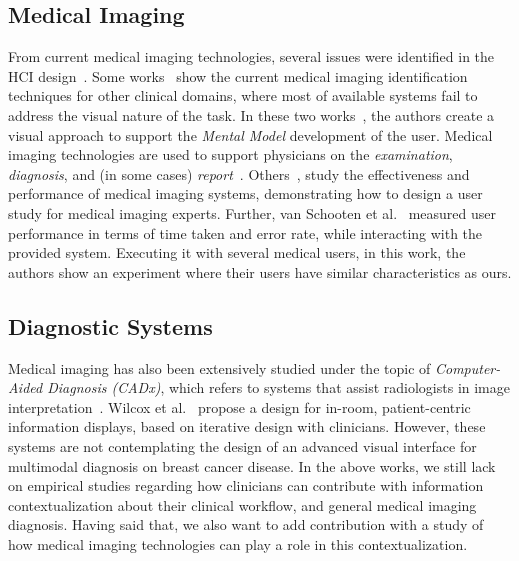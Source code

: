 \subsection{Medical Imaging}

From current medical imaging technologies, several issues were identified in the HCI design~\cite{Calisto:2017:TTM:3132272.3134111, calisto2017mimbcdui, Igarashi:2016:IVS:2984511.2984537}.
Some works~\cite{Balducci:2018:BQA:3206505.3206555, Rosado:2015:NFS:2826165.2826213} show the current medical imaging identification techniques for other clinical domains, where most of available systems fail to address the visual nature of the task.
In these two works~\cite{Balducci:2018:BQA:3206505.3206555, Rosado:2015:NFS:2826165.2826213}, the authors create a visual approach to support the \textit{Mental Model} development of the user.
Medical imaging technologies are used to support physicians on the \textit{examination}, \textit{diagnosis}, and (in some cases) \textit{report}~\cite{10.1145/2639189.2639256}.
Others~\cite{10.1145/1385569.1385651, 10.1145/1842993.1843023, Sousa:2017:VVR:3025453.3025566}, study the effectiveness and performance of medical imaging systems, demonstrating how to design a user study for medical imaging experts.
Further, van Schooten et al.~\cite{10.1145/1842993.1843023} measured user performance in terms of time taken and error rate, while interacting with the provided system.
Executing it with several medical users, in this work, the authors show an experiment where their users have similar characteristics as ours.

\subsection{Diagnostic Systems}

Medical imaging has also been extensively studied under the topic of \textit{Computer-Aided Diagnosis (CADx)}, which refers to systems that assist radiologists in image interpretation~\cite{Oram:2014:CDR:2598510.2598585, 10.1145/3359206}.
Wilcox et al.~\cite{Wilcox:2010:DPI:1753326.1753650} propose a design for in-room, patient-centric information displays, based on iterative design with clinicians.
However, these systems are not contemplating the design of an advanced visual interface for multimodal diagnosis on breast cancer disease.
In the above works, we still lack on empirical studies regarding how clinicians can contribute with information contextualization about their clinical workflow, and general medical imaging diagnosis.
Having said that, we also want to add contribution with a study of how medical imaging technologies can play a role in this contextualization.